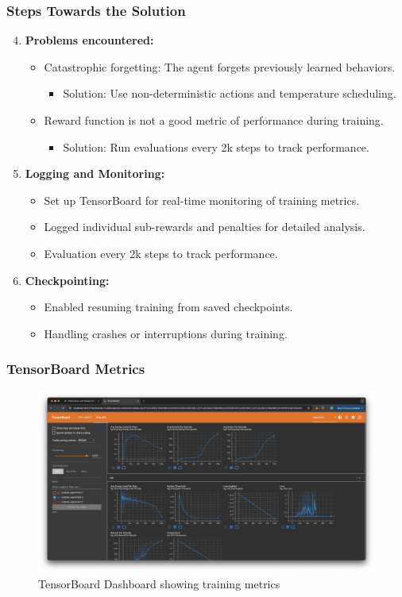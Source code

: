 \documentclass{beamer}
\begin{document}
\begin{frame}
\frametitle{Steps Towards the Solution}
\begin{enumerate}
    \setcounter{enumi}{3}
    \item \textbf{Problems encountered:}
    \begin{itemize}
        \item Catastrophic forgetting: The agent forgets previously learned behaviors.
        \begin{itemize}
            \item Solution: Use non-deterministic actions and temperature scheduling.
        \end{itemize}
        \item Reward function is not a good metric of performance during training.
        \begin{itemize}
            \item Solution: Run evaluations every 2k steps to track performance.
        \end{itemize}
    \end{itemize}
    \item \textbf{Logging and Monitoring:}
    \begin{itemize}
        \item Set up TensorBoard for real-time monitoring of training metrics.
        \item Logged individual sub-rewards and penalties for detailed analysis.
        \item Evaluation every 2k steps to track performance.
    \end{itemize}
    \item \textbf{Checkpointing:}
    \begin{itemize}
        \item Enabled resuming training from saved checkpoints.
        \item Handling crashes or interruptions during training.
    \end{itemize}
\end{enumerate}
\end{frame}

\begin{frame}
\frametitle{TensorBoard Metrics}
\begin{figure}[ht]
    \centering
    \includegraphics[width=1.0\textwidth]{images/tensorboard_dashboard.png}
    \caption{TensorBoard Dashboard showing training metrics}
    \label{fig:tensorboard_dashboard}
\end{figure}
\end{frame}
\end{document}
